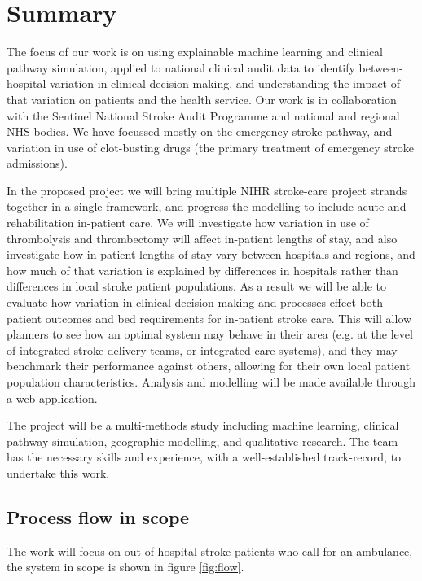 \section*{Summary}

The focus of our work is on using explainable machine learning and clinical pathway simulation, applied to national clinical audit data to identify between-hospital variation in clinical decision-making, and understanding the impact of that variation on patients and the health service. Our work is in collaboration with the Sentinel National Stroke Audit Programme and national and regional NHS bodies. We have focussed mostly on the emergency stroke pathway, and variation in use of clot-busting drugs (the primary treatment of emergency stroke admissions).

In the proposed project we will bring multiple NIHR stroke-care project strands together in a single framework, and progress the modelling to include acute and rehabilitation in-patient care. We will investigate how variation in use of thrombolysis and thrombectomy will affect in-patient lengths of stay, and also investigate how in-patient lengths of stay vary between hospitals and regions, and how much of that variation is explained by differences in hospitals rather than differences in local stroke patient populations. As a result we will be able to evaluate how variation in clinical decision-making and processes effect both patient outcomes and bed requirements for in-patient stroke care. This will allow planners to see how an optimal system may behave in their area (e.g. at the level of integrated stroke delivery teams, or integrated care systems), and they may benchmark their performance against others, allowing for their own local patient population characteristics. Analysis and modelling will be made available through a web application.

The project will be a multi-methods study including machine learning, clinical pathway simulation, geographic modelling, and qualitative research. The team has the necessary skills and experience, with a well-established track-record, to undertake this work.

\subsection*{Process flow in scope}

The work will focus on out-of-hospital stroke patients who call for an ambulance, the system in scope is shown in figure \ref{fig:flow}.

